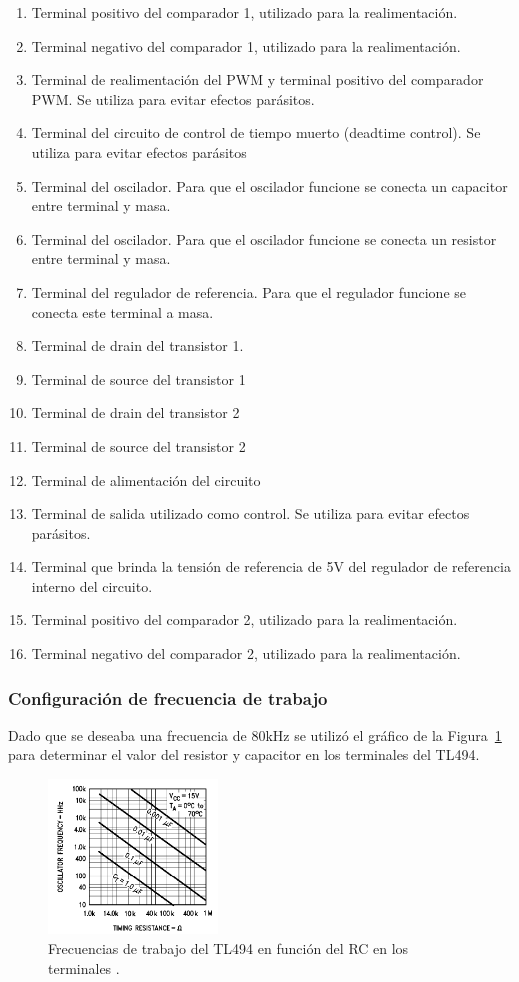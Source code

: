 \begin{enumerate}
\item Terminal positivo del comparador 1, utilizado para la realimentación.
\item Terminal negativo del comparador 1, utilizado para la realimentación.
\item Terminal de realimentación del PWM y terminal positivo del comparador PWM. Se utiliza para evitar efectos parásitos.
\item Terminal del circuito de control de tiempo muerto (deadtime control). Se utiliza para evitar efectos parásitos
\item Terminal del oscilador. Para que el oscilador funcione se conecta un capacitor entre terminal y masa.
\item Terminal del oscilador. Para que el oscilador funcione se conecta un resistor entre terminal y masa.
\item Terminal del regulador de referencia. Para que el regulador funcione se conecta este terminal a masa.
\item Terminal de drain del transistor 1. 
\item Terminal de source del transistor 1
\item Terminal de drain del transistor 2
\item Terminal de source del transistor 2
\item Terminal de alimentación del circuito
\item Terminal de salida utilizado como control. Se utiliza para evitar efectos parásitos.
\item  Terminal que brinda la tensión de referencia de 5V del regulador de referencia interno del circuito.
\item Terminal positivo del comparador 2, utilizado para la realimentación.
\item Terminal negativo del comparador 2, utilizado para la realimentación.
\end{enumerate}

\subsubsection{Configuración de frecuencia de trabajo}

Dado que se deseaba una frecuencia de 80kHz se utilizó el gráfico de la Figura~\ref{frec_tl494} para determinar el valor del resistor y capacitor en los terminales del TL494.

\begin{figure}[H]
\centering
\includegraphics[width=0.4\textwidth]{img/frec_TL494.png}
\caption{Frecuencias de trabajo del TL494 en función del RC en los terminales .}
\label{frec_tl494}
\end{figure}